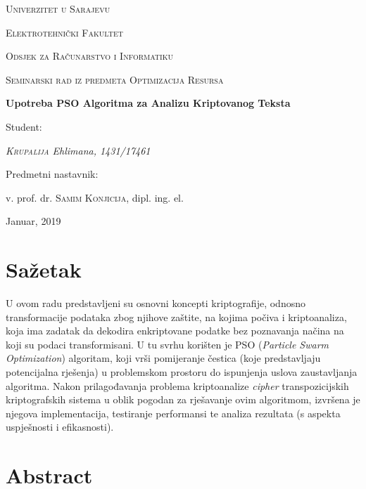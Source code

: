\documentclass[12pt, a4paper]{article}
\begin{document}
\begin{titlepage}
	\centering
	{\scshape Univerzitet u Sarajevu \par}
	{\scshape Elektrotehnički Fakultet \par}
	{\scshape Odsjek za Računarstvo i Informatiku \par}
	\vspace{2cm}
	{\Large\scshape Seminarski rad iz predmeta Optimizacija Resursa\par}
	\vspace{2.5cm}
	{\huge\bfseries Upotreba PSO Algoritma za Analizu Kriptovanog Teksta\par}
	\vspace{2.5cm}
	\Large Student: \par
	{\Large\itshape \textsc{Krupalija} Ehlimana, 1431/17461\par}
	\vfill
	Predmetni nastavnik:\par
	v. prof. dr. \textsc{Samim Konjicija}, dipl. ing. el.
	\vfill
	{\large Januar, 2019\par}
\end{titlepage}


\section*{Sažetak}

U ovom radu predstavljeni su osnovni koncepti kriptografije, odnosno transformacije podataka zbog njihove zaštite, na kojima počiva i kriptoanaliza, koja ima zadatak da dekodira enkriptovane podatke bez poznavanja načina na koji su podaci transformisani. U tu svrhu korišten je PSO (\textit{Particle Swarm Optimization}) algoritam, koji vrši pomijeranje čestica (koje predstavljaju potencijalna rješenja) u problemskom prostoru do ispunjenja uslova zaustavljanja algoritma. Nakon prilagođavanja problema kriptoanalize \textit{cipher} transpozicijskih kriptografskih sistema u oblik pogodan za rješavanje ovim algoritmom, izvršena je njegova implementacija, testiranje performansi te analiza rezultata (s aspekta uspješnosti i efikasnosti).

\section*{Abstract}
\end{document}
